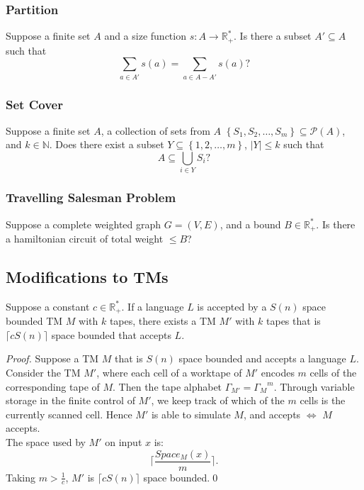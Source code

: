 \subsubsection{Partition} Suppose a finite set $A$ and a size function $s: A\to
\mathbb{R}^{*}_{+}$. Is there a subset $A'\subseteq A$ such that
\[\sum_{a\in A'}s(a)=\sum_{a\in A-A'}s(a)?\]

\subsubsection{Set Cover} Suppose a finite set $A$, a collection of sets from $A$
$\left\{ S_1,S_2,\ldots,S_m \right\} \subseteq \mathcal{P}\left( A \right) $,
and $k\in \mathbb{N}$. Does there exist a subset $Y\subseteq \left\{
1,2,\ldots,m \right\} $, $\left| Y \right| \le k$ such that
\[A\subseteq  \bigcup_{i \in Y} S_i?\]

\subsubsection{Travelling Salesman Problem} Suppose a complete weighted graph
$G=\left( V,E \right) $, and a bound $B\in \mathbb{R}^{*}_{+}$. Is there a
hamiltonian circuit of total weight $\le B$?

\subsection{Modifications to TMs}
\begin{theorem}
  Suppose a constant $c\in \mathbb{R}^{*}_{+}$. If a language $L$ is accepted
  by a $S(n)$ space bounded TM $M$ with $k$ tapes, there exists a TM $M'$ with
  $k$ tapes that is $\lceil cS(n)\rceil$ space bounded that accepts $L$.
\end{theorem}
\begin{proof}
  Suppose a TM $M$ that is $S(n)$ space bounded and accepts a language $L$.\\

  Consider the TM $M'$, where each cell of a worktape of $M'$ encodes $m$ cells
  of the corresponding tape of $M$. Then the tape alphabet
  $\Gamma_{M'}={\Gamma_M}^{m}$. Through variable storage in the finite control
  of $M'$, we keep track of which of the $m$ cells is the currently scanned
  cell. Hence $M'$ is able to simulate $M$, and accepts $\iff$ $M$ accepts.\\

  The space used by $M'$ on input $x$ is:
  \[\lceil \frac{Space_M\left( x \right) }{m}\rceil.\]
  Taking $m>\frac{1}{c}$, $M'$ is $\lceil cS(n) \rceil$ space bounded.\qed
\end{proof}

